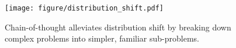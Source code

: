 \begin{figure}[t]
    \centering
        \texttt{[image: figure/distribution\_shift.pdf]}
    \caption{ Chain-of-thought alleviates distribution shift by breaking down complex problems into simpler, familiar sub-problems.}
    \label{fig:disbution_shift}
\end{figure}

